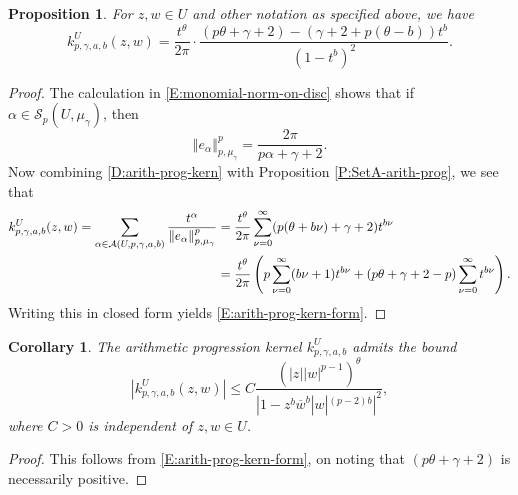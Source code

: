 \documentclass[letterpaper,11pt,reqno]{amsart}
\theoremstyle{plain}
\newtheorem{proposition}[equation]{Proposition}
\newtheorem{corollary}[equation]{Corollary}
\theoremstyle{definition}
\theoremstyle{remark}
\theoremstyle{remark}
\numberwithin{equation}{section}
\newcommand{\norm}[1]{\left\Vert#1\right\Vert}
\newcommand{\ol}{\overline}
\newcommand{\mug}{{\mu_{\gamma}}}
\newcommand{\ca}{{\mathcal A}}
\newcommand{\cs}{{\mathcal S}}
\begin{document}
\begin{proposition}\label{P:arith-prog-kernel}
For $z,w\in U$ and other notation as specified above, we have 
\begin{equation}\label{E:arith-prog-kern-form}
k^{U}_{p,\gamma,a,b}(z,w) = \frac{t^{\theta}}{2\pi} \cdot \frac{(p\theta + \gamma +2) - (\gamma+2+p(\theta-b))t^{b}}{(1-t^b)^2}.
\end{equation}
\end{proposition}

\begin{proof} 
The calculation in \eqref{E:monomial-norm-on-disc} shows that if $\alpha \in \cs_p(U,\mug)$, then
\begin{equation*}
\norm{e_{\alpha}}^p_{p,\mug} =  \frac{2\pi}{p\alpha + \gamma + 2}.
\end{equation*}
Now combining \eqref{D:arith-prog-kern} with Proposition \ref{P:SetA-arith-prog}, we see that
\begin{align*}
k^{U}_{p,\gamma,a,b}(z,w) 
=  \sum_{\alpha \in \ca(U,p,\gamma,a,b)} \frac{t^\alpha}{\norm{e_\alpha}_{p,\mug}^p} 
&= \frac{t^\theta}{2\pi} \sum_{\nu=0}^\infty (p(\theta + b\nu) + \gamma + 2)t^{b\nu} \\
&= \frac{t^\theta}{2\pi} \left(p\sum_{\nu=0}^\infty (b\nu+1) t^{b\nu} + (p \theta + \gamma + 2 -p)\sum_{\nu=0}^\infty t^{b\nu} \right) \notag.
\end{align*}
Writing this in closed form yields \eqref{E:arith-prog-kern-form}.
    
\end{proof}
\begin{corollary}\label{C:kernel-bound}
The arithmetic progression kernel $k^U_{p,\gamma,a,b}$ admits the bound
\begin{equation*}
\left|k^{U}_{p,\gamma,a,b}(z,w)\right| \le C \frac{(|z||w|^{p-1})^{\theta}}{|1-z^b\ol{w}^b|w|^{(p-2)b}|^2},
\end{equation*}
where $C>0$ is independent of $z,w \in U$.
\end{corollary}
\begin{proof}
This follows from \eqref{E:arith-prog-kern-form}, on noting that $(p\theta + \gamma +2)$ is necessarily positive.
\end{proof}
\end{document}
